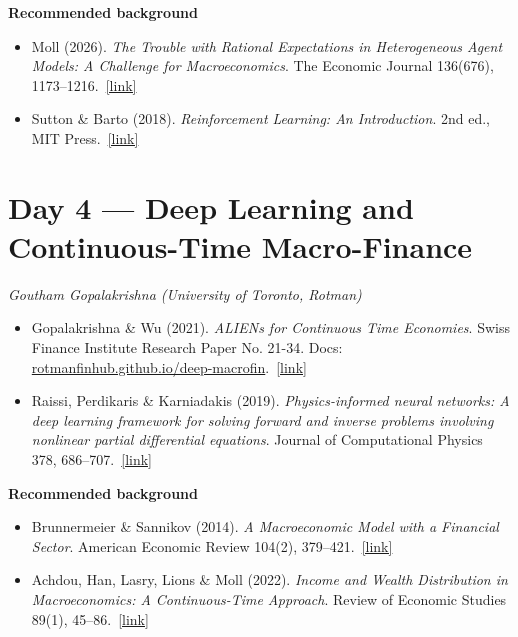 \documentclass[11pt]{article}
\newcommand{\reading}[5]{%
  \item #1. \textit{#2}. #3.\ \href{#4}{[link]}%
}
\newcommand{\bglabel}{\smallskip\noindent\textbf{\color{accent}Recommended background}\par\nopagebreak\smallskip}
\begin{document}
\bglabel
\begin{itemize}
  \reading{Moll (2026)}{The Trouble with Rational Expectations in Heterogeneous Agent Models: A Challenge for Macroeconomics}{The Economic Journal 136(676), 1173--1216}{https://doi.org/10.1093/ej/ueaf104}{Argues that rational expectations about equilibrium prices --- which force agents to forecast the entire cross-sectional distribution (the ``master equation'') --- are computationally and behaviorally implausible, and points to learning and reinforcement-learning alternatives; the conceptual motivation for the structural-RL lecture.}
  \reading{Sutton \& Barto (2018)}{Reinforcement Learning: An Introduction}{2nd ed., MIT Press}{http://incompleteideas.net/book/the-book-2nd.html}{}
\end{itemize}

\section*{Day 4 --- Deep Learning and Continuous-Time Macro-Finance}
\textit{Goutham Gopalakrishna (University of Toronto, Rotman)}
\smallskip

\begin{itemize}
  \reading{Gopalakrishna \& Wu (2021)}{ALIENs for Continuous Time Economies}{Swiss Finance Institute Research Paper No. 21-34. Docs: \href{https://rotmanfinhub.github.io/deep-macrofin/}{rotmanfinhub.github.io/\allowbreak deep-macrofin}}{https://ssrn.com/abstract=3848657}{The instructor's flagship method: Active-Learning-Inspired Equilibrium Nets solve high-dimensional, nonlinear continuous-time macro-finance models by combining time-stepping with active learning over the economically important regions of the state space.}
  \reading{Raissi, Perdikaris \& Karniadakis (2019)}{Physics-informed neural networks: A deep learning framework for solving forward and inverse problems involving nonlinear partial differential equations}{Journal of Computational Physics 378, 686--707}{https://doi.org/10.1016/j.jcp.2018.10.045}{}
\end{itemize}

\bglabel
\begin{itemize}
  \reading{Brunnermeier \& Sannikov (2014)}{A Macroeconomic Model with a Financial Sector}{American Economic Review 104(2), 379--421}{https://www.aeaweb.org/articles?id=10.1257/aer.104.2.379}{The foundational continuous-time macro-finance model with a financial sector; its full nonlinear crisis dynamics are the canonical problem class these solvers target.}
  \reading{Achdou, Han, Lasry, Lions \& Moll (2022)}{Income and Wealth Distribution in Macroeconomics: A Continuous-Time Approach}{Review of Economic Studies 89(1), 45--86}{https://academic.oup.com/restud/article/89/1/45/6149490}{Recasts the Aiyagari--Bewley--Huggett model in continuous time as coupled HJB and Kolmogorov-forward PDEs --- the continuous-time HA toolkit underlying the lectures.}
\end{itemize}
\end{document}
